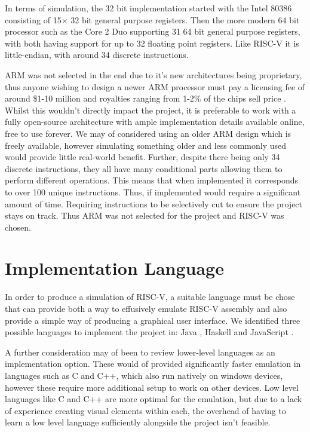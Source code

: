 In terms of simulation, the 32 bit implementation started with the Intel 80386 \cite{intel_1998_intel386} consisting of 15$\times$ 32 bit general purpose registers. Then the more modern 64 bit processor such as the Core 2 Duo \cite{intel_2007_intel} supporting 31 64 bit general purpose registers, with both having support for up to 32 floating point registers. Like RISC-V it is little-endian, with around 34 discrete instructions.

ARM was not selected in the end due to it's new architectures being proprietary, thus anyone wishing to design a newer ARM processor must pay a licensing fee of around \$1-10 million \cite{strategyzerag_2014_arm} and royalties ranging from 1-2\% of the chips sell price \cite{strategyzerag_2014_arm}. Whilst this wouldn't directly impact the project, it is preferable to work with a fully open-source architecture with ample implementation details available online, free to use forever. We may of considered using an older ARM design which is freely available, however simulating something older and less commonly used would provide little real-world benefit. Further, despite there being only 34 discrete instructions, they all have many conditional parts allowing them to perform different operations. This means that when implemented it corresponds to over 100 unique instructions. Thus, if implemented would require a significant amount of time. Requiring instructions to be selectively cut to ensure the project stays on track. Thus ARM was not selected for the project and RISC-V was chosen.

\section{Implementation Language}
In order to produce a simulation of RISC-V, a suitable language must be chose that can provide both a way to effusively emulate RISC-V assembly and also provide a simple way of producing a graphical user interface. We identified three possible languages to implement the project in: Java \cite{sunmicrosystems_2022_java}, Haskell \cite{marlow_2010_haskell} and JavaScript \cite{ecmainternational_2023_ecmascript}.

A further consideration may of been to review lower-level languages as an implementation option. These would of provided significantly faster emulation in languages such as C and C++, which also run natively on windows devices, however these require more additional setup to work on other devices. Low level languages like C and C++ are more optimal for the emulation, but due to a lack of experience creating visual elements within each, the overhead of having to learn a low level language sufficiently alongside the project isn't feasible.

